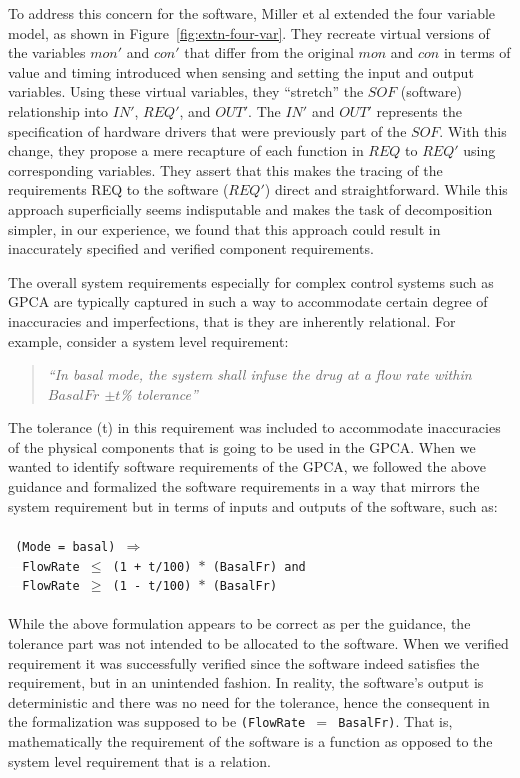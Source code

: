 To address this concern for the software, Miller et al extended the four variable model, as shown in Figure~\ref{fig:extn-four-var}. They recreate virtual versions of the variables $mon'$ and $con'$ that differ from the original $mon$ and $con$ in terms of value and timing introduced when sensing and setting the input and output variables. Using these virtual variables, they ``stretch'' the $SOF$ (software) relationship into $IN'$, $REQ'$, and $OUT'$. The $IN'$ and $OUT'$ represents the specification of hardware drivers that were previously part of the $SOF$. With this change, they propose a mere recapture of each function in $REQ$ to $REQ'$ using corresponding variables. They assert that this makes the tracing of the requirements REQ to the software ($REQ'$) direct and straightforward. While this approach superficially seems indisputable and makes the task of decomposition simpler, in our experience, we found that this approach could result in inaccurately specified and verified component requirements.

The overall system requirements especially for complex control systems such as GPCA are typically captured in such a way to accommodate certain degree of inaccuracies and imperfections, that is they are inherently relational. For example, consider a system level requirement:

\begin{quotation}
\emph{``In basal mode, the system shall infuse the drug at a flow rate within $BasalFr$ $\pm t$\% tolerance''}
\end{quotation}

The tolerance (t) in this requirement was included to accommodate inaccuracies of the physical components that is going to be used in the GPCA. When we wanted to identify software requirements of the GPCA, we followed the above guidance and formalized the software requirements in a way that mirrors the system requirement but in terms of inputs and outputs of the software, such as:
\\\\
\footnotesize{\texttt{
(Mode = basal) $\Rightarrow$\\
\textcolor{white}{------}FlowRate $\leq$ (1 + t/100) $\ast$ (BasalFr) and \\
\textcolor{white}{------}FlowRate $\geq$ (1 - t/100) $\ast$ (BasalFr)\\
}}
\normalsize{}\\
While the above formulation appears to be correct as per the guidance, the tolerance part was not intended to be allocated to the software. When we verified requirement it was successfully verified since the software indeed satisfies the requirement, but in an unintended fashion. In reality, the software's output is deterministic and there was no need for the tolerance, hence the consequent in the formalization was supposed to be \texttt{(FlowRate $=$ BasalFr)}. That is, mathematically the requirement of the software is a function as opposed to the system level requirement that is a relation. %

